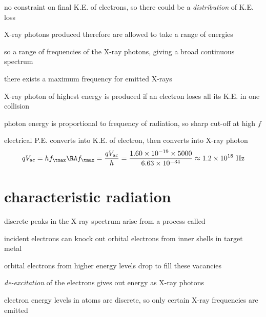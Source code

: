 no constraint on final K.E. of electrons, so there could be a \emph{distribution} of K.E. loss

X-ray photons produced therefore are allowed to take a range of energies

so a range of frequencies of the X-ray photons, giving a broad continuous spectrum

\cmt there exists a maximum frequency for emitted X-rays
	
X-ray photon of highest energy is produced if an electron loses all its K.E. in one collision

photon energy is proportional to frequency of radiation, so sharp cut-off at high $f$


\sol electrical P.E. converts into K.E. of electron, then converts into X-ray photon
\begin{equation*}
	qV_\text{ac} = hf_\tmax \RA f_\tmax = \frac{qV_\text{ac}}{h} = \frac{1.60\times10^{-19}\times 5000}{6.63\times10^{-34}} \approx 1.2\times10^{18} \text{ Hz} 
\end{equation*}





\section*{characteristic radiation}

discrete peaks in the X-ray spectrum arise from a process called 

incident electrons can knock out orbital electrons from inner shells in target metal

orbital electrons from higher energy levels drop to fill these vacancies

\emph{de-excitation} of the electrons gives out energy as X-ray photons

electron energy levels in atoms are discrete, so only certain X-ray frequencies are emitted


